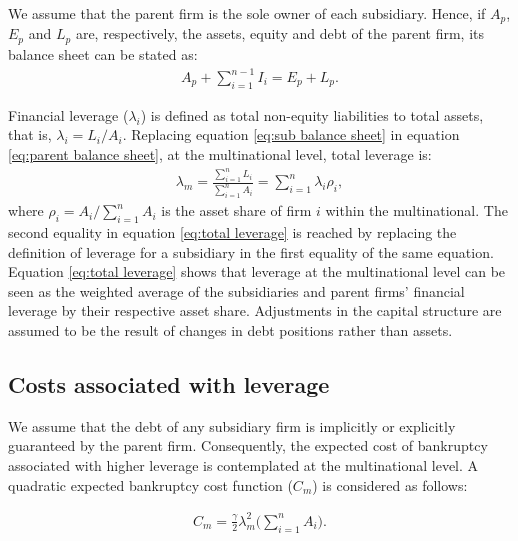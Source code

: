 \documentclass[12pt]{article}
\begin{document}
	We assume that the parent firm is the sole owner of each subsidiary. Hence, if $A_p$, $E_p$ and $L_p$ are, respectively, the assets, equity and debt of the parent firm, its balance sheet can be stated as: 
	\begin{equation}
	\begin{aligned}
	A_p+\sum_{i=1}^{n-1}I_i=E_p+L_p. 
	\end{aligned}
	\label{eq:parent balance sheet}
	\end{equation}
	
	Financial leverage ($\lambda_i$) is defined as total non-equity liabilities to total assets, that is, $\lambda_i=L_i/A_i$. Replacing equation \ref{eq:sub balance sheet} in equation \ref{eq:parent balance sheet}, at the multinational level, total leverage is:
	\begin{equation}
	\begin{aligned}
	\lambda_m=\frac{\sum_{i=1}^{n}L_i}{\sum_{i=1}^{n}A_i}=\sum_{i=1}^{n}\lambda_i\rho_i, 
	\end{aligned}
	\label{eq:total leverage}
	\end{equation} 
	where $\rho_i=A_i/\sum_{i=1}^{n}A_i$ is the asset share of firm $i$ within the multinational. The second equality in equation \ref{eq:total leverage} is reached by replacing the definition of leverage for a subsidiary in the first equality of the same equation. Equation \ref{eq:total leverage} shows that leverage at the multinational level can be seen as the weighted average of the subsidiaries and parent firms' financial leverage by their respective asset share. Adjustments in the capital structure are assumed to be the result of changes in debt positions rather than assets. 
	
	\subsection{Costs associated with leverage}
	\label{subsec:costs}
	We assume that the debt of any subsidiary firm is implicitly or explicitly guaranteed by the parent firm. Consequently, the expected cost of bankruptcy associated with higher leverage is contemplated at the multinational level. A quadratic expected bankruptcy cost function ($C_m$) is considered as follows:
	
	\begin{equation}
	\begin{aligned}
	C_m=\frac{\gamma}{2}\lambda_m^2\bigg(\sum_{i=1}^{n}A_i\bigg).
	\end{aligned}
	\label{eq:cost bankruptcy}
	\end{equation}
	
\end{document}
